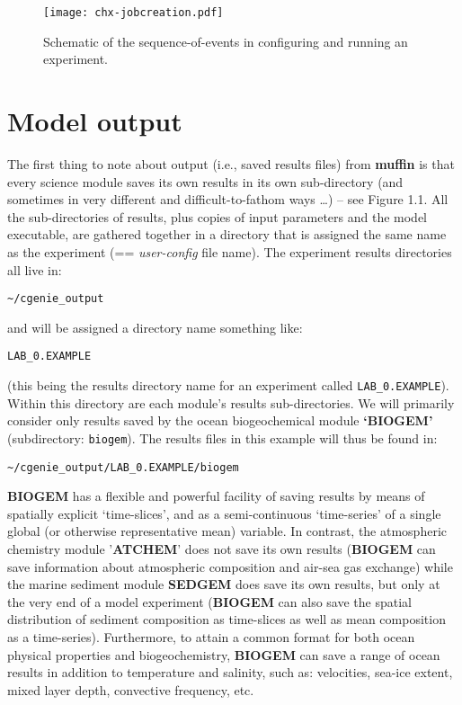 \documentclass[11pt,fleqn]{book} %
\begin{document}
\begin{figure}
\texttt{[image: chx-jobcreation.pdf]}\centering
\vspace{-0mm}
\caption{Schematic of the sequence-of-events in configuring and running an experiment.}
\label{fig:chx-jobcreation}
\end{figure}


\newpage


\section{Model output}

The first thing to note about output (i.e., saved results files) from \textbf{muffin} is that every science module saves its own results in its own sub-directory (and sometimes in very different and difficult-to-fathom ways …) – see Figure 1.1. All the sub-directories of results, plus copies of input parameters and the model executable, are gathered together in a directory that is assigned the same name as the experiment (== \textit{user-config} file name). The experiment results directories all live in:
\begin{verbatim}
~/cgenie_output
\end{verbatim}
and will be assigned a directory name something like:
\begin{verbatim}
LAB_0.EXAMPLE
\end{verbatim}
(this being the results directory name for an experiment called \texttt{LAB\_0.EXAMPLE}). Within this directory are each module’s results sub-directories.
We will primarily consider only results saved by the ocean biogeochemical module \textbf{‘BIOGEM’} (subdirectory: \small\texttt{biogem}\normalsize). The results files in this example will thus be found in:
\begin{verbatim}
~/cgenie_output/LAB_0.EXAMPLE/biogem
\end{verbatim}
\textbf{BIOGEM} has a flexible and powerful facility of saving results by means of spatially explicit ‘time-slices’, and as a semi-continuous ‘time-series’ of a single global (or otherwise representative mean) variable. In contrast, the atmospheric chemistry module '\textbf{ATCHEM}' does not save its own results (\textbf{BIOGEM} can save information about atmospheric composition and air-sea gas exchange) while the marine sediment module \textbf{SEDGEM} does save its own results, but only at the very end of a model experiment (\textbf{BIOGEM} can also save the spatial distribution of sediment composition as time-slices as well as mean composition as a time-series). Furthermore, to attain a common format for both ocean physical properties and biogeochemistry, \textbf{BIOGEM} can save a range of ocean results in addition to temperature and salinity, such as: velocities, sea-ice extent, mixed layer depth, convective frequency, etc.
\end{document}
